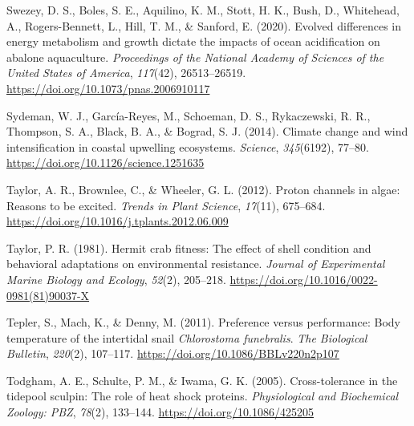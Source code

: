 \documentclass{CSUNthesis}
\begin{document}
\vspace{0.1em}

Swezey, D. S., Boles, S. E., Aquilino, K. M., Stott, H. K., Bush, D., Whitehead, A., Rogers-Bennett, L., Hill, T. M., \& Sanford, E. (2020). Evolved differences in energy metabolism and growth dictate the impacts of ocean acidification on abalone aquaculture. \textit{Proceedings of the National Academy of Sciences of the United States of America}, \textit{117}(42), 26513--26519. \url{https://doi.org/10.1073/pnas.2006910117}

\vspace{0.1em}

Sydeman, W. J., García-Reyes, M., Schoeman, D. S., Rykaczewski, R. R., Thompson, S. A., Black, B. A., \& Bograd, S. J. (2014). Climate change and wind intensification in coastal upwelling ecosystems. \textit{Science}, \textit{345}(6192), 77--80. \url{https://doi.org/10.1126/science.1251635}

\vspace{0.1em}

Taylor, A. R., Brownlee, C., \& Wheeler, G. L. (2012). Proton channels in algae: Reasons to be excited. \textit{Trends in Plant Science}, \textit{17}(11), 675--684. \url{https://doi.org/10.1016/j.tplants.2012.06.009}

\vspace{0.1em}

Taylor, P. R. (1981). Hermit crab fitness: The effect of shell condition and behavioral adaptations on environmental resistance. \textit{Journal of Experimental Marine Biology and Ecology}, \textit{52}(2), 205--218. \url{https://doi.org/10.1016/0022-0981(81)90037-X}

\vspace{0.1em}

Tepler, S., Mach, K., \& Denny, M. (2011). Preference versus performance: Body temperature of the intertidal snail \textit{Chlorostoma funebralis}. \textit{The Biological Bulletin}, \textit{220}(2), 107--117. \url{https://doi.org/10.1086/BBLv220n2p107}

\vspace{0.1em}

Todgham, A. E., Schulte, P. M., \& Iwama, G. K. (2005). Cross-tolerance in the tidepool sculpin: The role of heat shock proteins. \textit{Physiological and Biochemical Zoology: PBZ}, \textit{78}(2), 133--144. \url{https://doi.org/10.1086/425205}

\vspace{0.1em}
\end{document}
